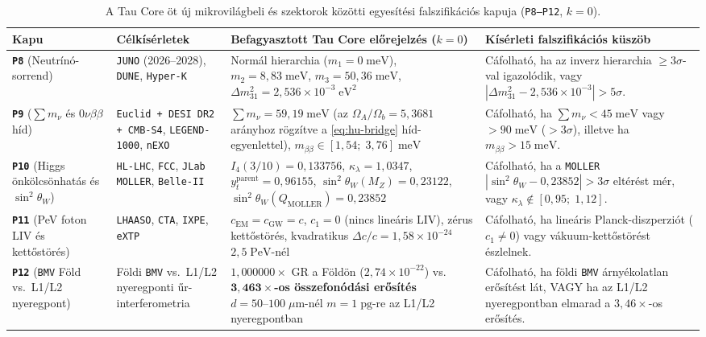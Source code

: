 \documentclass[11pt,a4paper]{article}
\begin{document}
\begin{table}[htbp]
\centering
\caption{A Tau Core öt új mikrovilágbeli és szektorok közötti egyesítési falszifikációs kapuja (\texttt{P8--P12}, $k=0$).}
\label{tab:hu-gates}
\footnotesize
\renewcommand{\arraystretch}{1.22}
\begin{tabularx}{\textwidth}{@{}p{}p{}p{}X@{}}
\toprule
\textbf{Kapu} & \textbf{Célkísérletek} & \textbf{Befagyasztott Tau Core előrejelzés ($k=0$)} & \textbf{Kísérleti falszifikációs küszöb} \\
\midrule
\textbf{\texttt{P8}} (Neutrínó-sorrend) & \texttt{JUNO} (2026--2028), \texttt{DUNE}, \texttt{Hyper-K} & Normál hierarchia ($m_1=0\;\mathrm{meV}$), $m_2=8{,}83\;\mathrm{meV}$, $m_3=50{,}36\;\mathrm{meV}$, $\Delta m_{31}^2 = 2{,}536\times 10^{-3}\;\mathrm{eV}^2$ & Cáfolható, ha az inverz hierarchia $\ge 3\sigma$-val igazolódik, vagy $|\Delta m_{31}^2 - 2{,}536\times 10^{-3}| > 5\sigma$. \\
\textbf{\texttt{P9}} ($\sum m_\nu$ és $0\nu\beta\beta$ híd) & \texttt{Euclid + DESI DR2 + CMB-S4}, \texttt{LEGEND-1000}, \texttt{nEXO} & $\sum m_\nu = 59{,}19\;\mathrm{meV}$ (az $\Omega_A/\Omega_b=5{,}3681$ arányhoz rögzítve a \eqref{eq:hu-bridge} híd-egyenlettel), $m_{\beta\beta}\in[1{,}54;\;3{,}76]\;\mathrm{meV}$ & Cáfolható, ha $\sum m_\nu < 45\;\mathrm{meV}$ vagy $> 90\;\mathrm{meV}$ ($>3\sigma$), illetve ha $m_{\beta\beta}>15\;\mathrm{meV}$. \\
\textbf{\texttt{P10}} (Higgs önkölcsönhatás és $\sin^2\theta_W$) & \texttt{HL-LHC}, \texttt{FCC}, \texttt{JLab MOLLER}, \texttt{Belle-II} & $I_4(3/10)=0{,}133756$, $\kappa_\lambda = 1{,}0347$, $y_t^{\mathrm{parent}}=0{,}96155$, $\sin^2\theta_W(M_Z)=0{,}23122$, $\sin^2\theta_W(Q_{\mathrm{MOLLER}})=0{,}23852$ & Cáfolható, ha a \texttt{MOLLER} $|\sin^2\theta_W - 0{,}23852|>3\sigma$ eltérést mér, vagy $\kappa_\lambda\notin[0{,}95;\;1{,}12]$. \\
\textbf{\texttt{P11}} (PeV foton LIV és kettőstörés) & \texttt{LHAASO}, \texttt{CTA}, \texttt{IXPE}, \texttt{eXTP} & $c_{\mathrm{EM}}=c_{\mathrm{GW}}=c$, $c_1=0$ (nincs lineáris LIV), zérus kettőstörés, kvadratikus $\Delta c/c = 1{,}58\times 10^{-24}$ $2{,}5\;\mathrm{PeV}$-nél & Cáfolható, ha lineáris Planck-diszperziót ($c_1\neq 0$) vagy vákuum-kettőstörést észlelnek. \\
\textbf{\texttt{P12}} (\texttt{BMV} Föld vs.\ L1/L2 nyeregpont) & Földi \texttt{BMV} vs.\ L1/L2 nyeregponti űr-interferometria & $1{,}000000\times$ GR a Földön ($2{,}74\times 10^{-22}$) vs.\ $\mathbf{3{,}463\times}$\textbf{-os összefonódási erősítés} $d=50\text{--}100\;\mu\mathrm{m}$-nél $m=1\;\mathrm{pg}$-re az L1/L2 nyeregpontban & Cáfolható, ha földi \texttt{BMV} árnyékolatlan erősítést lát, VAGY ha az L1/L2 nyeregpontban elmarad a $3{,}46\times$-os erősítés. \\

\end{tabularx}
\end{table}
\end{document}
